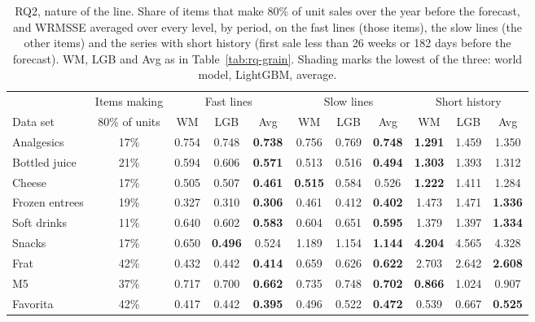 \begin{table}[t]
\centering\footnotesize\setlength{\tabcolsep}{3pt}
\caption{RQ2, nature of the line. Share of items that make 80\% of unit sales over the year before the forecast, and
WRMSSE averaged over every level, by period, on the fast lines (those items), the slow lines (the other items) and the
series with short history (first sale less than 26 weeks or 182 days before the forecast). WM, LGB and Avg as in
Table~\ref{tab:rq-grain}. Shading marks the lowest of the three: \colorbox{wmcell}{world model}, \colorbox{lgbcell}{LightGBM}, \colorbox{avgcell}{average}.}
\label{tab:rq-lines}
\begin{adjustbox}{max width=\textwidth}\begin{tabular}{l c ccc ccc ccc}
\toprule
 & Items making & \multicolumn{3}{c}{Fast lines} & \multicolumn{3}{c}{Slow lines} & \multicolumn{3}{c}{Short history}\\
\cmidrule(lr){3-5}\cmidrule(lr){6-8}\cmidrule(lr){9-11}
Data set & 80\% of units & WM & LGB & Avg & WM & LGB & Avg & WM & LGB & Avg\\
\midrule
Analgesics & 17\% & 0.754 & 0.748 & \cellcolor{avgcell}\textbf{0.738} & 0.756 & 0.769 & \cellcolor{avgcell}\textbf{0.748} & \cellcolor{wmcell}\textbf{1.291} & 1.459 & 1.350 \\
Bottled juice & 21\% & 0.594 & 0.606 & \cellcolor{avgcell}\textbf{0.571} & 0.513 & 0.516 & \cellcolor{avgcell}\textbf{0.494} & \cellcolor{wmcell}\textbf{1.303} & 1.393 & 1.312 \\
Cheese & 17\% & 0.505 & 0.507 & \cellcolor{avgcell}\textbf{0.461} & \cellcolor{wmcell}\textbf{0.515} & 0.584 & 0.526 & \cellcolor{wmcell}\textbf{1.222} & 1.411 & 1.284 \\
Frozen entrees & 19\% & 0.327 & 0.310 & \cellcolor{avgcell}\textbf{0.306} & 0.461 & 0.412 & \cellcolor{avgcell}\textbf{0.402} & 1.473 & 1.471 & \cellcolor{avgcell}\textbf{1.336} \\
Soft drinks & 11\% & 0.640 & 0.602 & \cellcolor{avgcell}\textbf{0.583} & 0.604 & 0.651 & \cellcolor{avgcell}\textbf{0.595} & 1.379 & 1.397 & \cellcolor{avgcell}\textbf{1.334} \\
Snacks & 17\% & 0.650 & \cellcolor{lgbcell}\textbf{0.496} & 0.524 & 1.189 & 1.154 & \cellcolor{avgcell}\textbf{1.144} & \cellcolor{wmcell}\textbf{4.204} & 4.565 & 4.328 \\
Frat & 42\% & 0.432 & 0.442 & \cellcolor{avgcell}\textbf{0.414} & 0.659 & 0.626 & \cellcolor{avgcell}\textbf{0.622} & 2.703 & 2.642 & \cellcolor{avgcell}\textbf{2.608} \\
M5 & 37\% & 0.717 & 0.700 & \cellcolor{avgcell}\textbf{0.662} & 0.735 & 0.748 & \cellcolor{avgcell}\textbf{0.702} & \cellcolor{wmcell}\textbf{0.866} & 1.024 & 0.907 \\
Favorita & 42\% & 0.417 & 0.442 & \cellcolor{avgcell}\textbf{0.395} & 0.496 & 0.522 & \cellcolor{avgcell}\textbf{0.472} & 0.539 & 0.667 & \cellcolor{avgcell}\textbf{0.525} \\
\bottomrule
\end{tabular}\end{adjustbox}
\end{table}
